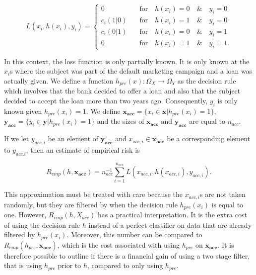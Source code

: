 \documentclass{article}
\theoremstyle{theorem}
\theoremstyle{definition}
\newcommand{\bv}[1]{\bm{#1}}
\begin{document}
\begin{equation}
\label{def:empRiskBank}
L(x_i, h(x_i), y_i) = 
\begin{cases}
0     &\quad \mbox{for} \quad h(x_i) = 0 \quad \& \quad y_i = 0\\
c_i(1|0)    &\quad \mbox{for} \quad h(x_i) = 1 \quad \& \quad y_i = 0\\
c_i(0|1)      &\quad \mbox{for} \quad h(x_i) = 0 \quad \& \quad y_i = 1\\
0   &\quad \mbox{for} \quad h(x_i) = 1 \quad \& \quad y_i = 1.
\end{cases}
\end{equation}

In this context, the loss function is only partially known.  It is only known at the $x_i$s where the subject was part of the default marketing campaign and a loan was actually given.  We define a function $h_{pre}(x): \Omega_X \rightarrow \Omega_Y$ as the decision rule which involves that the bank decided to offer a loan and also that the subject decided to accept the loan more than two years ago.  Consequently, $y_i$ is only known given $h_{pre}(x_i) = 1$.  We define $\bv{x_{acc}} = \{x_i \in \bv{x} | h_{pre}(x_i) = 1\}$, $\bv{y_{acc}} = \{y_i \in \bv{y} | h_{pre}(x_i) = 1\}$ and the sizes of $\bv{x_{acc}} $ and $\bv{y_{acc}} $ are equal to $n_{acc}$.

If we let $y_{acc,i}$ be an element of $\bv{y_{acc}} $ and $x_{acc,i} \in \bv{x_{acc}} $ be a corresponding element to $y_{acc.i}$, then an estimate of empirical risk is 

\begin{equation}
\label{def:empRiskLimited}
R_{emp}(h, \bv{x_{acc}}) = n_{acc}^{-1} \sum_{i=1}^{n_{acc}} L(x_{acc,i}, h(x_{acc,i}), y_{acc,i}).
\end{equation}

This approximation must be treated with care because the $x_{acc,i}$s are not taken randomly, but they are filtered by when the decision rule $h_{pre}(x_i)$ is equal to one.  However, $R_{emp}(h, X_{acc})$ has a practical interpretation.  It is the extra cost of using the decision rule $h$ instead of a perfect classifier on data that are already filtered by $h_{pre}(x_i)$.  Moreover, this number can be compared to $R_{emp}(h_{pre}, \bv{x_{acc}})$, which is the cost associated with using $h_{pre}$ on $\bv{x_{acc}}$.  It is therefore possible to outline if there is a financial gain of using a two stage filter, that is using $h_{pre}$ prior to $h$, compared to only using $h_{pre}$.
\end{document}
